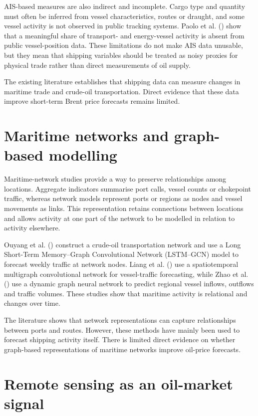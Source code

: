 \documentclass[
  british,
  12pt,
  oneside]{book}
\begin{document}
AIS-based measures are also indirect and incomplete. Cargo type and quantity must often be inferred from vessel characteristics, routes or draught, and some vessel activity is not observed in public tracking systems. Paolo et al. () show that a meaningful share of transport- and energy-vessel activity is absent from public vessel-position data. These limitations do not make AIS data unusable, but they mean that shipping variables should be treated as noisy proxies for physical trade rather than direct measurements of oil supply.

The existing literature establishes that shipping data can measure changes in maritime trade and crude-oil transportation. Direct evidence that these data improve short-term Brent price forecasts remains limited.

\section{Maritime networks and graph-based modelling}\label{lit-networks}

Maritime-network studies provide a way to preserve relationships among locations. Aggregate indicators summarise port calls, vessel counts or chokepoint traffic, whereas network models represent ports or regions as nodes and vessel movements as links. This representation retains connections between locations and allows activity at one part of the network to be modelled in relation to activity elsewhere.

Ouyang et al. () construct a crude-oil transportation network and use a Long Short-Term Memory--Graph Convolutional Network (LSTM--GCN) model to forecast weekly traffic at network nodes. Liang et al. () use a spatiotemporal multigraph convolutional network for vessel-traffic forecasting, while Zhao et al. () use a dynamic graph neural network to predict regional vessel inflows, outflows and traffic volumes. These studies show that maritime activity is relational and changes over time.

The literature shows that network representations can capture relationships between ports and routes. However, these methods have mainly been used to forecast shipping activity itself. There is limited direct evidence on whether graph-based representations of maritime networks improve oil-price forecasts.

\section{Remote sensing as an oil-market signal}\label{lit-remote}
\end{document}
